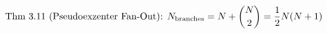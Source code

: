 \documentclass[preview]{standalone}
\begin{document}
\begin{align*}
\special{dvisvgm:raw <g id='unique000'>}\text{Thm 3.11 (Pseudoexzenter Fan-Out): } N_{\text{branches}} = N + \binom{N}{2} = \frac{1}{2}N(N+1)\special{dvisvgm:raw </g>}
\end{align*}
\end{document}
